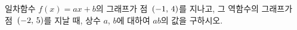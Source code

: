 \hspace*{2mm}\begin{minipage}[t]{\dimexpr\linewidth-2mm\relax}\vspace{0pt}
일차함수 $f(x)=ax+b$의 그래프가 점~$(-1,\mkern3mu 4)$를 지나고, 그 역함수의 그래프가 점~$(-2,\mkern3mu 5)$를 지날 때, 상수 $a$, $b$에 대하여 $ab$의 값을 구하시오.\end{minipage}
